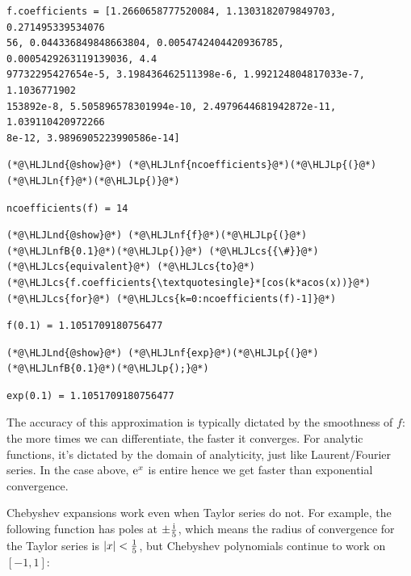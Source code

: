 \documentclass[12pt,a4paper]{article}
\newcommand{\HLJLn}[1]{#1}
\newcommand{\HLJLnd}[1]{\textcolor[RGB]{214,102,97}{#1}}
\newcommand{\HLJLnf}[1]{\textcolor[RGB]{66,102,213}{#1}}
\newcommand{\HLJLnfB}[1]{\textcolor[RGB]{59,151,46}{#1}}
\newcommand{\HLJLp}[1]{#1}
\newcommand{\HLJLcs}[1]{\textcolor[RGB]{153,153,119}{\textit{#1}}}
\def\I{ {\rm i} }
\def\E{ {\rm e} }
\begin{document}
\begin{lstlisting}
f.coefficients = [1.2660658777520084, 1.1303182079849703, 0.271495339534076
56, 0.044336849848663804, 0.0054742404420936785, 0.0005429263119139036, 4.4
97732295427654e-5, 3.198436462511398e-6, 1.992124804817033e-7, 1.1036771902
153892e-8, 5.505896578301994e-10, 2.4979644681942872e-11, 1.039110420972266
8e-12, 3.9896905223990586e-14]
\end{lstlisting}


\begin{lstlisting}
(*@\HLJLnd{@show}@*) (*@\HLJLnf{ncoefficients}@*)(*@\HLJLp{(}@*)(*@\HLJLn{f}@*)(*@\HLJLp{)}@*)
\end{lstlisting}

\begin{lstlisting}
ncoefficients(f) = 14
\end{lstlisting}


\begin{lstlisting}
(*@\HLJLnd{@show}@*) (*@\HLJLnf{f}@*)(*@\HLJLp{(}@*)(*@\HLJLnfB{0.1}@*)(*@\HLJLp{)}@*) (*@\HLJLcs{{\#}}@*) (*@\HLJLcs{equivalent}@*) (*@\HLJLcs{to}@*) (*@\HLJLcs{f.coefficients{\textquotesingle}*[cos(k*acos(x))}@*) (*@\HLJLcs{for}@*) (*@\HLJLcs{k=0:ncoefficients(f)-1]}@*)
\end{lstlisting}

\begin{lstlisting}
f(0.1) = 1.1051709180756477
\end{lstlisting}


\begin{lstlisting}
(*@\HLJLnd{@show}@*) (*@\HLJLnf{exp}@*)(*@\HLJLp{(}@*)(*@\HLJLnfB{0.1}@*)(*@\HLJLp{);}@*)
\end{lstlisting}

\begin{lstlisting}
exp(0.1) = 1.1051709180756477
\end{lstlisting}


The accuracy of this approximation is typically dictated by the smoothness of $f$: the more times we can differentiate, the faster it converges.  For analytic functions, it's dictated by the domain of analyticity, just like Laurent/Fourier series. In the case above, $\E^x$ is entire hence we get faster than exponential convergence.

Chebyshev expansions work even when Taylor series do not. For example, the following function has poles at $\pm {\I \over 5}$, which means the radius of convergence for the Taylor series is $|x| < {1 \over 5}$,  but Chebyshev polynomials continue to work on $[-1,1]$:
\end{document}
